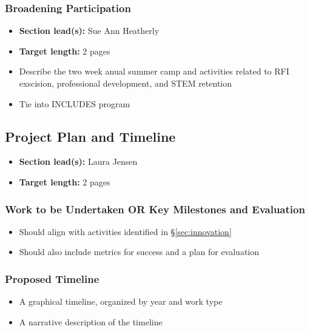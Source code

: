 \documentclass[10pt]{myNSF}
\begin{document}
\subsubsection{Broadening Participation}
\label{sec:participation}

\begin{itemize}
\item{\textbf{Section lead(s):} Sue Ann Heatherly}
\item{\textbf{Target length:} 2 pages}
\item{Describe the two week anual summer camp and activities related
  to RFI exscision, professional development, and STEM retention}
\item{Tie into INCLUDES program}
\end{itemize}

\subsection{Project Plan and Timeline}
\label{sec:plan}

\begin{itemize}
\item{\textbf{Section lead(s):} Laura Jensen}
\item{\textbf{Target length:} 2 pages}
\end{itemize}

\subsubsection{Work to be Undertaken OR Key Milestones and Evaluation}
\label{sec:milestones}

\begin{itemize}
\item{Should align with activities identified in
    \S\ref{sec:innovation}}
\item{Should also include metrics for success and a plan for evaluation}
\end{itemize}


\subsubsection{Proposed Timeline}
\label{sec:timeline}

\begin{itemize}
\item{A graphical timeline, organized by year and work type}
\item{A narrative description of the timeline}
\end{itemize}
\end{document}
